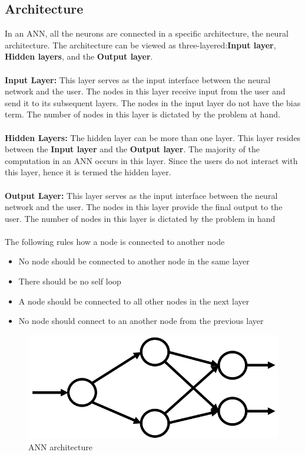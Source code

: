 \documentclass[12pt,a4paper,bold]{thesis}
\theoremstyle{thm}
\theoremstyle{definition}
\begin{document}
\subsection{Architecture}
In an ANN, all the neurons are connected in a specific architecture, the neural architecture. 
The architecture can be viewed as three-layered:\textbf{Input layer}, \textbf{Hidden layers}, and the \textbf{Output layer}.\\
\\
\textbf{Input Layer:}
This layer serves as the input interface between the neural network and the user. The nodes in this layer receive input from the user and send it to its subsequent layers. The nodes in the input layer do not have the bias term. The number of nodes in this layer is dictated by the problem at hand. \\
\\
\textbf{Hidden Layers:}
The hidden layer can be more than one layer. This layer resides between the \textbf{Input layer} and the \textbf{Output layer}. The majority of the computation in an ANN occurs in this layer.  
Since the users do not interact with this layer, hence it is termed the hidden layer.\\
\\
\textbf{Output Layer:}
This layer serves as the input interface between the neural network and the user. The nodes in this layer provide the final output to the user. The number of nodes in this layer is dictated by the problem in hand\\\\
The following rules how a node is connected to another node
\begin{itemize}
	\item No node should be connected to another node in the same layer
	\item There should be no self loop
	\item A node should be connected to all other nodes in the next layer
	\item No node should connect to an another node from the previous layer

\end{itemize}
\begin{figure}[H]
	\centering
   \includegraphics[scale=0.56]{Images/35.png} 
   \caption{ANN architecture }
\end{figure}
\end{document}
